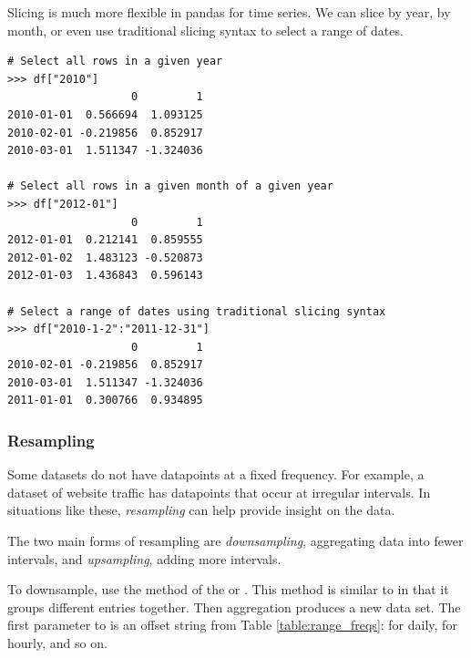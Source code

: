 Slicing is much more flexible in pandas for time series. We can slice by year, by month, or even use traditional slicing syntax to select a range of dates.

\begin{lstlisting}
# Select all rows in a given year
>>> df["2010"]
                   0         1
2010-01-01  0.566694  1.093125
2010-02-01 -0.219856  0.852917
2010-03-01  1.511347 -1.324036

# Select all rows in a given month of a given year
>>> df["2012-01"]
                   0         1
2012-01-01  0.212141  0.859555
2012-01-02  1.483123 -0.520873
2012-01-03  1.436843  0.596143

# Select a range of dates using traditional slicing syntax
>>> df["2010-1-2":"2011-12-31"]
                   0         1
2010-02-01 -0.219856  0.852917
2010-03-01  1.511347 -1.324036
2011-01-01  0.300766  0.934895
\end{lstlisting}

\subsubsection*{Resampling} %

Some datasets do not have datapoints at a fixed frequency.
For example, a dataset of website traffic has datapoints that occur at irregular intervals.
In situations like these, \emph{resampling} can help provide insight on the data.

The two main forms of resampling are \emph{downsampling}, aggregating data into fewer intervals, and \emph{upsampling}, adding more intervals.

To downsample, use the  method of the  or .
This method is similar to  in that it groups different entries together.
Then aggregation produces a new data set.
The first parameter to  is an offset string from Table \ref{table:range_freqs}:  for daily,  for hourly, and so on.


